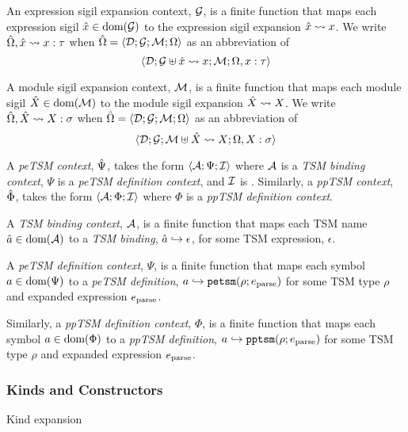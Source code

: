 An expression sigil expansion context, $\mathcal{G}$, is a finite function that maps each expression sigil ${\hat x} \in \text{dom}(\mathcal{G})$ to the expression sigil expansion ${\hat x} \leadsto x$. We write ${\hat\Omega}, {\hat x} \leadsto x : \tau$ when ${\hat\Omega}=\langle \mathcal{D}; \mathcal{G}; \mathcal{M}; \Omega \rangle$ as an abbreviation of \[\langle \mathcal{D}; \mathcal{G} \uplus {\hat x} \leadsto x; \mathcal{M}; \Omega, x : \tau \rangle\]

A module sigil expansion context, $\mathcal{M}$, is a finite function that maps each module sigil ${\hat X} \in \text{dom}(\mathcal{M})$ to the module sigil expansion ${\hat X} \leadsto X$. We write ${\hat\Omega}, {\hat X} \leadsto X : \sigma$ when ${\hat\Omega}=\langle \mathcal{D}; \mathcal{G}; \mathcal{M}; \Omega \rangle$ as an abbreviation of \[\langle \mathcal{D}; \mathcal{G}; \mathcal{M} \uplus {\hat X} \leadsto X; \Omega, X : \sigma \rangle\]

A \emph{peTSM context}, $\hat{\Psi}$, takes the form $\langle \mathcal{A}; \Psi; \mathcal{I} \rangle$ where $\mathcal{A}$ is a \emph{TSM binding context}, $\Psi$ is a \emph{peTSM definition context}, and $\mathcal{I}$ is . Similarly, a \emph{ppTSM context}, $\hat\Phi$, takes the form $\langle \mathcal{A}; \Phi; \mathcal{I} \rangle$ where $\Phi$ is a \emph{ppTSM definition context}.

A \emph{TSM binding context}, $\mathcal{A}$, is a finite function that maps each TSM name $\hat{a} \in \text{dom}(\mathcal{A})$ to a \emph{TSM binding}, $\hat{a} \hookrightarrow \epsilon$, for some TSM expression, $\epsilon$.

A \emph{peTSM definition context}, $\Psi$, is a finite function that maps each symbol $a \in \text{dom}(\Psi)$ to a \emph{peTSM definition}, $a \hookrightarrow \texttt{petsm}(\rho; e_\text{parse})$ for some TSM type $\rho$ and expanded expression $e_\text{parse}$.

Similarly, a \emph{ppTSM definition context}, $\Phi$, is a finite function that maps each symbol $a \in \text{dom}(\Phi)$ to a \emph{ppTSM definition}, $a \hookrightarrow \texttt{pptsm}(\rho; e_\text{parse})$ for some TSM type $\rho$ and expanded expression $e_\text{parse}$.

\subsubsection{Kinds and Constructors}
Kind expansion

